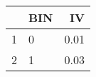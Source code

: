\begin{table}[ht]
\centering
\begin{tabular}{rlr}
  \hline
 & BIN & IV \\ 
  \hline
1 & 0 & 0.01 \\ 
  2 & 1 & 0.03 \\ 
   \hline
\end{tabular}
\end{table}
